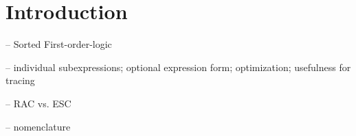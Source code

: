 \chapter{Introduction}

-- Sorted First-order-logic

-- individual subexpressions; optional expression form; optimization; usefulness for tracing

-- RAC vs. ESC

-- nomenclature

